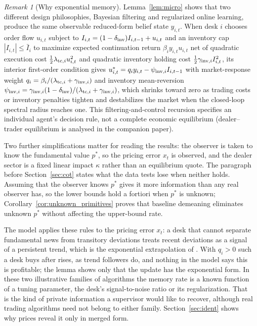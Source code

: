 \documentclass[12pt]{article}
\theoremstyle{definition}
\theoremstyle{remark}
\newtheorem{remark}[theorem]{Remark}
\begin{document}
\begin{remark}[Why exponential memory]
Lemma~\ref{lem:micro} shows that two different design philosophies, Bayesian filtering and regularized online learning, produce the same observable reduced-form belief state $y_{i,t}$. When desk $i$ chooses order flow $u_{i,t}$ subject to $I_{i,t}=(1-\delta_{\rm inv})I_{i,t-1}+u_{i,t}$ and an inventory cap $|I_{i,t}|\le\bar I_i$ to maximize expected continuation return $\beta_i y_{i,t}u_{i,t}$ net of quadratic execution cost $\tfrac12\lambda_{{\rm tc},i}u_{i,t}^2$ and quadratic inventory holding cost $\tfrac12\gamma_{{\rm inv},i}I_{i,t}^2$, its interior first-order condition gives $u_{i,t}^*=q_iy_{i,t}-\psi_{{\rm inv},i}I_{i,t-1}$ with market-response weight $q_i=\beta_i/(\lambda_{{\rm tc},i}+\gamma_{{\rm inv},i})$ and inventory mean-reversion $\psi_{{\rm inv},i}=\gamma_{{\rm inv},i}(1-\delta_{\rm inv})/(\lambda_{{\rm tc},i}+\gamma_{{\rm inv},i})$, which shrinks toward zero as trading costs or inventory penalties tighten and destabilizes the market when the closed-loop spectral radius reaches one. This filtering-and-control recursion specifies an individual agent's decision rule, not a complete economic equilibrium (dealer--trader equilibrium is analysed in the companion paper).

Two further simplifications matter for reading the results: the observer is taken to know the fundamental value $p^*$, so the pricing error $x_t$ is observed, and the dealer sector is a fixed linear impact $\kappa$ rather than an equilibrium quote. The paragraph before Section~\ref{sec:cot} states what the data tests lose when neither holds. Assuming that the observer knows $p^*$ gives it more information than any real observer has, so the lower bounds hold a fortiori when $p^*$ is unknown; Corollary~\ref{cor:unknown_primitives} proves that baseline demeaning eliminates unknown $p^*$ without affecting the upper-bound rate.

The model applies these rules to the pricing error $x_t$: a desk that cannot separate fundamental news from transitory deviations treats recent deviations as a signal of a persistent trend, which is the exponential extrapolation of \citet{barberis2015,barberis2018}. With $q_i>0$ such a desk buys after rises, as trend followers do, and nothing in the model says this is profitable; the lemma shows only that the update has the exponential form. In these two illustrative families of algorithms the memory rate is a known function of a tuning parameter, the desk's signal-to-noise ratio or its regularization. That is the kind of private information a supervisor would like to recover, although real trading algorithms need not belong to either family. Section~\ref{sec:ident} shows why prices reveal it only in merged form.
\end{remark}
\end{document}
